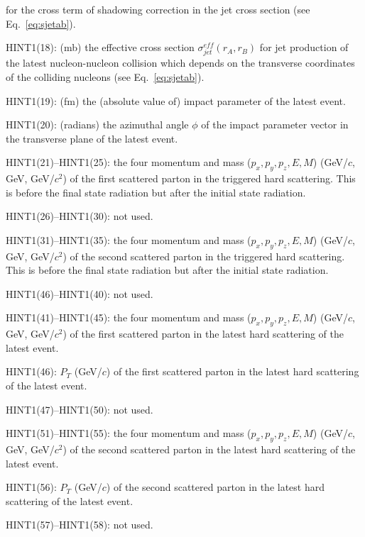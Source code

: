 \begin{description}
                for the cross term of shadowing correction in the jet 
                cross section (see Eq.~\ref{eq:sjetab}).
\item{}HINT1(18): (mb) the effective cross section 
                $\sigma_{jet}^{eff}(r_A,r_B)$ for jet production 
                of the latest nucleon-nucleon collision which depends 
                on the transverse coordinates of the colliding 
                nucleons (see Eq.~\ref{eq:sjetab}).
\item{}HINT1(19): (fm) the (absolute value of) impact parameter of the 
                latest event.
\item{}HINT1(20): (radians) the azimuthal angle $\phi$ of the impact
                parameter vector in the transverse plane of the latest 
                event.
\item{}HINT1(21)--HINT1(25): the four momentum and mass ($p_x,p_y,p_z,E,M$)
                (GeV/$c$, GeV, GeV/$c^2$) of the first scattered parton 
                in the triggered hard scattering. This is before the final
                state radiation but after the initial state radiation.
\item{}HINT1(26)--HINT1(30): not used.
\item{}HINT1(31)--HINT1(35): the four momentum and mass ($p_x,p_y,p_z,E,M$)
                (GeV/$c$, GeV, GeV/$c^2$) of the second scattered parton 
                in the triggered hard scattering. This is before the final
                state radiation but after the initial state radiation.
\item{}HINT1(46)--HINT1(40): not used.
\item{}HINT1(41)--HINT1(45): the four momentum and mass ($p_x,p_y,p_z,E,M$)
                (GeV/$c$, GeV, GeV/$c^2$) of the first scattered parton 
                in the latest hard scattering of the latest event.
\item{}HINT1(46): $P_T$ (GeV/$c$) of the first scattered parton in the 
                latest hard scattering of the latest event.
\item{}HINT1(47)--HINT1(50): not used.
\item{}HINT1(51)--HINT1(55): the four momentum and mass ($p_x,p_y,p_z,E,M$)
                (GeV/$c$, GeV, GeV/$c^2$) of the second scattered parton 
                in the latest hard scattering of the latest event.
\item{}HINT1(56): $P_T$ (GeV/$c$) of the second scattered parton in the 
                latest hard scattering of the latest event.
\item{}HINT1(57)--HINT1(58): not used.

\end{description}
